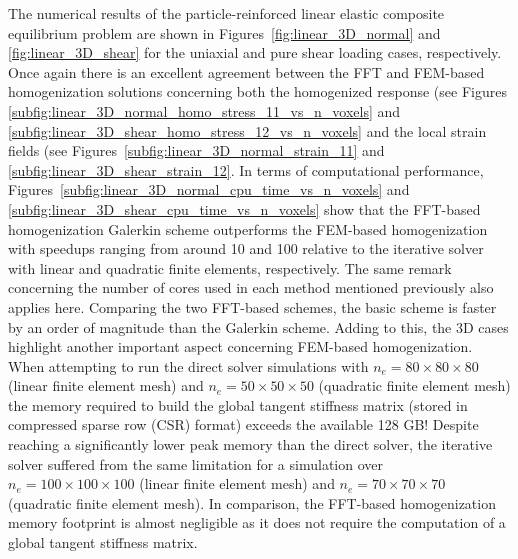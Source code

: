 The numerical results of the particle-reinforced linear elastic composite equilibrium problem are shown in Figures~\ref{fig:linear_3D_normal} and \ref{fig:linear_3D_shear} for the uniaxial and pure shear loading cases, respectively.
Once again there is an excellent agreement between the FFT and FEM-based homogenization solutions concerning both the homogenized response (see Figures \ref{subfig:linear_3D_normal_homo_stress_11_vs_n_voxels} and \ref{subfig:linear_3D_shear_homo_stress_12_vs_n_voxels} and the local strain fields (see Figures~\ref{subfig:linear_3D_normal_strain_11} and \ref{subfig:linear_3D_shear_strain_12}.
In terms of computational performance, Figures~\ref{subfig:linear_3D_normal_cpu_time_vs_n_voxels} and \ref{subfig:linear_3D_shear_cpu_time_vs_n_voxels} show that the FFT-based homogenization Galerkin scheme outperforms the FEM-based homogenization with speedups ranging from around 10 and 100 relative to the iterative solver with linear and quadratic finite elements, respectively.
The same remark concerning the number of cores used in each method mentioned previously also applies here.
Comparing the two FFT-based schemes, the basic scheme is faster by an order of magnitude than the Galerkin scheme.
Adding to this, the 3D cases highlight another important aspect concerning FEM-based homogenization. When attempting to run the direct solver simulations with \(n_{e}=80 \times 80 \times 80\) (linear finite element mesh) and \(n_{e}=50 \times 50 \times 50\) (quadratic finite element mesh) the memory required to build the global tangent stiffness matrix (stored in compressed sparse row (CSR) format) exceeds the available 128 GB!
Despite reaching a significantly lower peak memory than the direct solver, the iterative solver suffered from the same limitation for a simulation over \(n_{e}=100 \times 100 \times 100\) (linear finite element mesh) and \(n_{e}=70 \times 70 \times 70\) (quadratic finite element mesh).
In comparison, the FFT-based homogenization memory footprint is almost negligible as it does not require the computation of a global tangent stiffness matrix.

